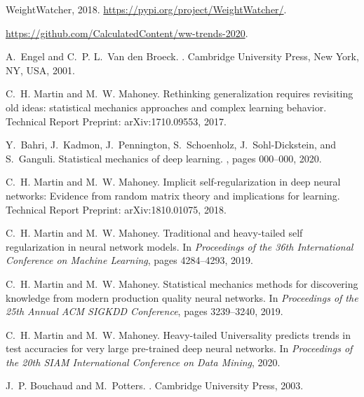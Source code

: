 \documentclass[11pt]{article}
\begin{document}
{\small

\begin{thebibliography}{10}

{WeightWatcher}, 2018.
\newblock \url{https://pypi.org/project/WeightWatcher/}.

\url{https://github.com/CalculatedContent/ww-trends-2020}.

A.~Engel and C.~P. L.~Van den Broeck.
.
\newblock Cambridge University Press, New York, NY, USA, 2001.

C.~H. Martin and M.~W. Mahoney.
\newblock Rethinking generalization requires revisiting old ideas: statistical
  mechanics approaches and complex learning behavior.
\newblock Technical Report Preprint: arXiv:1710.09553, 2017.

Y.~Bahri, J.~Kadmon, J.~Pennington, S.~Schoenholz, J.~Sohl-Dickstein, and
  S.~Ganguli.
\newblock Statistical mechanics of deep learning.
, pages 000--000,
  2020.

C.~H. Martin and M.~W. Mahoney.
\newblock Implicit self-regularization in deep neural networks: Evidence from
  random matrix theory and implications for learning.
\newblock Technical Report Preprint: arXiv:1810.01075, 2018.

C.~H. Martin and M.~W. Mahoney.
\newblock Traditional and heavy-tailed self regularization in neural network
  models.
\newblock In {\em Proceedings of the 36th International Conference on Machine
  Learning}, pages 4284--4293, 2019.

C.~H. Martin and M.~W. Mahoney.
\newblock Statistical mechanics methods for discovering knowledge from modern
  production quality neural networks.
\newblock In {\em Proceedings of the 25th Annual ACM SIGKDD Conference}, pages
  3239--3240, 2019.

C.~H. Martin and M.~W. Mahoney.
\newblock Heavy-tailed {U}niversality predicts trends in test accuracies for
  very large pre-trained deep neural networks.
\newblock In {\em Proceedings of the 20th SIAM International Conference on Data
  Mining}, 2020.

J.~P. Bouchaud and M.~Potters.
.
\newblock Cambridge University Press, 2003.


\end{thebibliography}}
\end{document}
